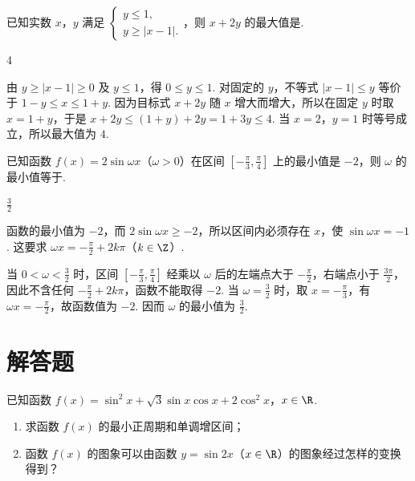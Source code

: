 \begin{problem}
已知实数 \(x\)，\(y\) 满足 \(\begin{cases}
y \leqslant 1,\\
y \geqslant |x - 1|.
\end{cases}\)，则 \(x + 2y\) 的最大值是\fillinblank{}.
\end{problem}

\begin{answer}
4
\end{answer}

\begin{solution}
由 \(y\geq|x-1|\geq0\) 及 \(y\leq1\)，得 \(0\leq y\leq1\). 对固定的 \(y\)，不等式 \(|x-1|\leq y\) 等价于
\(1-y\leq x\leq1+y\). 因为目标式 \(x+2y\) 随 \(x\) 增大而增大，所以在固定 \(y\) 时取 \(x=1+y\)，于是
\(x+2y\leq(1+y)+2y=1+3y\leq4\).
当 \(x=2\)，\(y=1\) 时等号成立，所以最大值为 \(4\).
\end{solution}

\begin{problem}
已知函数 \(f(x) = 2\sin \omega x\)（\(\omega > 0\)）在区间 \(\left[-\frac{\pi}{3}, \frac{\pi}{4}\right]\) 上的最小值是 \(-2\)，则 \(\omega\) 的最小值等于\fillinblank{}.
\end{problem}

\begin{answer}
\(\frac{3}{2}\)
\end{answer}

\begin{solution}
函数的最小值为 \(-2\)，而 \(2\sin\omega x\geq-2\)，所以区间内必须存在 \(x\)，使 \(\sin\omega x=-1\). 这要求
\(\omega x=-\frac{\pi}{2}+2k\pi\)（\(k\in\Z\)）.

当 \(0<\omega<\frac{3}{2}\) 时，区间 \(\left[-\frac{\pi}{3},\frac{\pi}{4}\right]\) 经乘以 \(\omega\) 后的左端点大于 \(-\frac{\pi}{2}\)，右端点小于 \(\frac{3\pi}{2}\)，因此不含任何 \(-\frac{\pi}{2}+2k\pi\)，函数不能取得 \(-2\). 当 \(\omega=\frac{3}{2}\) 时，取 \(x=-\frac{\pi}{3}\)，有 \(\omega x=-\frac{\pi}{2}\)，故函数值为 \(-2\). 因而 \(\omega\) 的最小值为 \(\frac{3}{2}\).
\end{solution}

\section{解答题}
\begin{problem}
已知函数 \(f(x) = \sin^{2}x + \sqrt{3}\sin x\cos x + 2\cos^{2}x\)，\(x \in \R\).

\begin{enumerate}
\item 求函数 \(f(x)\) 的最小正周期和单调增区间；
\item 函数 \(f(x)\) 的图象可以由函数 \(y = \sin 2x\)（\(x \in \R\)）的图象经过怎样的变换得到？
\end{enumerate}
\end{problem}

